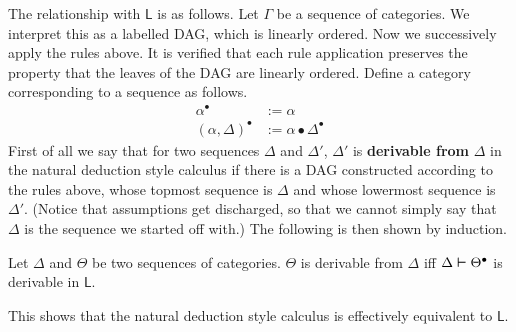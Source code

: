 The relationship with $\mathsf{L}$ is as follows. Let $\Gamma$ be a
sequence of categories. We interpret this as a labelled DAG, which
is linearly ordered. Now we successively apply the rules above. It
is verified that each rule application preserves the property that
the leaves of the DAG are linearly ordered. Define a category
corresponding to a sequence as follows.
\begin{equation}
\begin{split}
\alpha^{\bullet} & := \alpha \\
(\alpha,\Delta)^{\bullet} & := \alpha \bullet \Delta^{\bullet}
\end{split}
\end{equation}
First of all we say that for two sequences $\Delta$ and $\Delta'$,
$\Delta'$ is \textbf{derivable from} $\Delta$ in the natural deduction 
style calculus if there is a DAG constructed according to the rules 
above, whose topmost sequence is $\Delta$ and whose lowermost sequence
is $\Delta'$. (Notice that assumptions get discharged, so that we
cannot simply say that $\Delta$ is the sequence we started off with.)
The following is then shown by induction.
\begin{thm}
Let $\Delta$ and $\Theta$ be two sequences of categories. $\Theta$
is derivable from $\Delta$ iff $\Delta \boldsymbol{\vdash} \Theta^{\bullet}$ is 
derivable in $\mathsf{L}$.
\end{thm}
This shows that the natural deduction style calculus is
effectively equivalent to $\mathsf{L}$.

